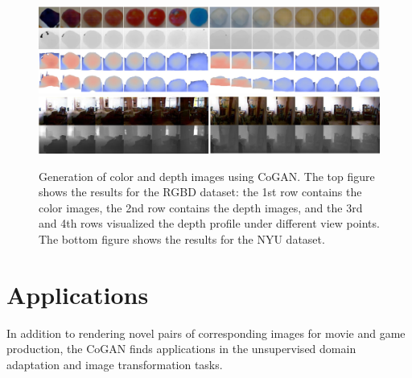 \begin{figure}[t!]
\centering
\includegraphics[trim=0in 0.1in 0in 0in, width=1.\textwidth]{result_rgbd_small.pdf}
\includegraphics[trim=0in 0.2in 0in 0in, width=1.\textwidth]{result_nyu_small.pdf}
\caption{\small Generation of color and depth images using CoGAN. The top figure shows the results for the RGBD dataset: the 1st row contains the color images, the 2nd row contains the depth images, and the 3rd and 4th rows visualized the depth profile under different view points. The bottom figure shows the results for the NYU dataset.}
\label{fig::result_rgbd}
\vspace{-2mm}
\end{figure}

\section{Applications}\label{sec::apps}

In addition to rendering novel pairs of corresponding images for movie and game production, the CoGAN finds applications in the unsupervised domain adaptation and image transformation tasks. 

